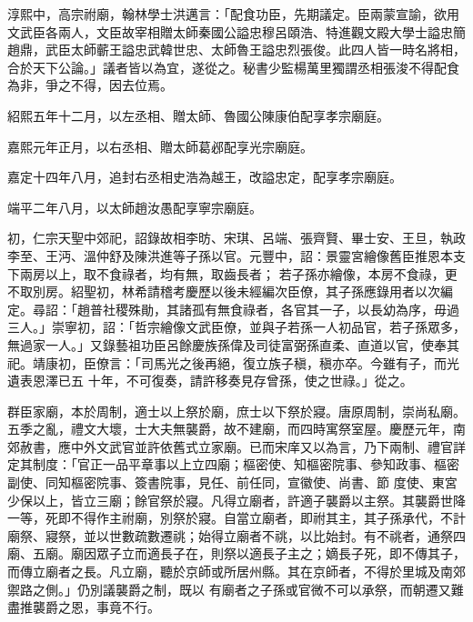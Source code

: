 \begin{pinyinscope}
 淳熙中，高宗祔廟，翰林學士洪邁言：「配食功臣，先期議定。臣兩蒙宣諭，欲用文武臣各兩人，文臣故宰相贈太師秦國公謚忠穆呂頤浩、特進觀文殿大學士謚忠簡趙鼎，武臣太師蘄王謚忠武韓世忠、太師魯王謚忠烈張俊。此四人皆一時名將相，合於天下公論。」議者皆以為宜，遂從之。秘書少監楊萬里獨謂丞相張浚不得配食為非，爭之不得，因去位焉。



 紹熙五年十二月，以左丞相、贈太師、魯國公陳康伯配享孝宗廟庭。



 嘉熙元年正月，以右丞相、贈太師葛邲配享光宗廟庭。



 嘉定十四年八月，追封右丞相史浩為越王，改謚忠定，配享孝宗廟庭。



 端平二年八月，以太師趙汝愚配享寧宗廟庭。



 初，仁宗天聖中郊祀，詔錄故相李昉、宋琪、呂端、張齊賢、畢士安、王旦，執政李至、王沔、溫仲舒及陳洪進等子孫以官。元豐中，詔：景靈宮繪像舊臣推恩本支下兩房以上，取不食祿者，均有無，取齒長者；
 若子孫亦繪像，本房不食祿，更不取別房。紹聖初，林希請稽考慶歷以後未經編次臣僚，其子孫應錄用者以次編定。尋詔：「趙普社稷殊勛，其諸孤有無食祿者，各官其一子，以長幼為序，毋過三人。」崇寧初，詔：「哲宗繪像文武臣僚，並與子若孫一人初品官，若子孫眾多，無過家一人。」又錄藝祖功臣呂餘慶族孫偉及司徒富弼孫直柔、直道以官，使奉其祀。靖康初，臣僚言：「司馬光之後再絕，復立族子稹，稹亦卒。今雖有子，而光遺表恩澤已五
 十年，不可復奏，請許移奏見存曾孫，使之世祿。」從之。



 群臣家廟，本於周制，適士以上祭於廟，庶士以下祭於寢。唐原周制，崇尚私廟。五季之亂，禮文大壞，士大夫無襲爵，故不建廟，而四時寓祭室屋。慶歷元年，南郊赦書，應中外文武官並許依舊式立家廟。已而宋庠又以為言，乃下兩制、禮官詳定其制度：「官正一品平章事以上立四廟；樞密使、知樞密院事、參知政事、樞密副使、同知樞密院事、簽書院事，見任、前任同，宣徽使、尚書、節
 度使、東宮少保以上，皆立三廟；餘官祭於寢。凡得立廟者，許適子襲爵以主祭。其襲爵世降一等，死即不得作主祔廟，別祭於寢。自當立廟者，即祔其主，其子孫承代，不計廟祭、寢祭，並以世數疏數遷祧；始得立廟者不祧，以比始封。有不祧者，通祭四廟、五廟。廟因眾子立而適長子在，則祭以適長子主之；嫡長子死，即不傳其子，而傳立廟者之長。凡立廟，聽於京師或所居州縣。其在京師者，不得於里城及南郊禦路之側。」仍別議襲爵之制，既以
 有廟者之子孫或官微不可以承祭，而朝遷又難盡推襲爵之恩，事竟不行。




\end{pinyinscope}
